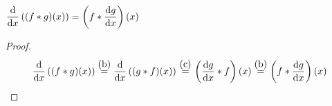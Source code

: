 $\displaystyle \dv{x} \pars{(f\ast g)(x)} = \pars{f \ast \dv{g}{x} }(x)$

\begin{proof}
    $$\dv{x} \pars{(f\ast g)(x)}\; \stackrel{\mathclap{\normalfont\mbox{(b)}}}{=} \; \dv{x} \pars{(g \ast f)(x)} \; \stackrel{\mathclap{\normalfont\mbox{(c)}}}{=} \; \pars{\dv{g}{x} \ast f }(x) 
    \; \stackrel{\mathclap{\normalfont\mbox{(b)}}}{=} \;  \pars{f \ast \dv{g}{x} }(x)
    $$
\end{proof}